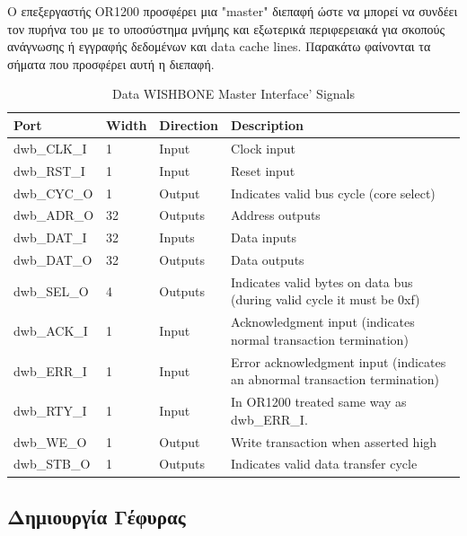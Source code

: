 \documentclass[a4paper,10pt]{article}
\numberwithin{figure}{section}
\numberwithin{table}{section}
\begin{document}
O επεξεργαστής OR1200 προσφέρει μια "master" διεπαφή ώστε να μπορεί να συνδέει τον πυρήνα του με το υποσύστημα μνήμης και εξωτερικά περιφερειακά για σκοπούς ανάγνωσης ή εγγραφής δεδομένων και data cache lines. Παρακάτω φαίνονται τα σήματα που προσφέρει αυτή η διεπαφή.
\newpage
{%
\vspace{0.7cm}
\renewcommand{\arraystretch}{1.2}
\setlength{\tabcolsep}{0.3em}
\newcommand{\mc}[3]{\multicolumn{#1}{#2}{#3}}
\begin{table}[h]
\begin{center}
\begin{tabular}{|l|l|l|p{6 cm}|}
\hline
\rowcolor{tcA}
Port & Width & Direction & Description\\\hline
dwb\_CLK\_I & 1 & Input & Clock input\\\hline
dwb\_RST\_I & 1 & Input & Reset input\\\hline
dwb\_CYC\_O & 1 & Output & Indicates valid bus cycle (core select)\\\hline
dwb\_ADR\_O & 32 & Outputs & Address outputs\\\hline
dwb\_DAT\_I & 32 & Inputs & Data inputs\\\hline
dwb\_DAT\_O & 32 & Outputs & Data outputs\\\hline
dwb\_SEL\_O & 4 & Outputs & Indicates valid bytes on data bus (during valid cycle it must be 0xf)\\\hline
dwb\_ACK\_I & 1 & Input & Acknowledgment input (indicates normal transaction termination)\\\hline
dwb\_ERR\_I & 1 & Input & Error acknowledgment input (indicates an abnormal transaction termination)\\\hline
dwb\_RTY\_I & 1 & Input & In OR1200 treated same way as dwb\_ERR\_I.\\\hline
dwb\_WE\_O & 1 & Output & Write transaction when asserted high\\\hline
dwb\_STB\_O & 1 & Outputs & Indicates valid data transfer cycle\\\hline
\end{tabular}
\end{center}
\caption{Data WISHBONE Master Interface’ Signals}
\end{table}
\vspace{0.7cm}
}

\newpage
\subsection{Δημιουργία Γέφυρας}
\end{document}
